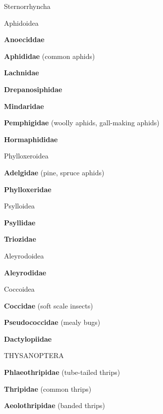 \documentclass[letterpaper,10pt]{article}
\begin{document}
{\makebox[0.20cm]{}  Sternorrhyncha \par
\makebox[0.40cm]{}  Aphidoidea \par
\makebox[0.6cm]{}  \textbf{Anoeciddae} \par
\makebox[0.6cm]{}  \textbf{Aphididae} (common aphids) \par
\makebox[0.6cm]{}  \textbf{Lachnidae} \par
\makebox[0.6cm]{}  \textbf{Drepanosiphidae} \par
\makebox[0.6cm]{}  \textbf{Mindaridae} \par
\makebox[0.6cm]{}  \textbf{Pemphigidae} (woolly aphids, gall-making aphids) \par
\makebox[0.6cm]{}  \textbf{Hormaphididae} \par
\makebox[0.40cm]{}  Phylloxeroidea \par
\makebox[0.6cm]{}  \textbf{Adelgidae} (pine, spruce aphids) \par
\makebox[0.6cm]{}  \textbf{Phylloxeridae} \par
\makebox[0.40cm]{}  Psylloidea \par
\makebox[0.6cm]{}  \textbf{Psyllidae} \par
\makebox[0.6cm]{}  \textbf{Triozidae} \par
\makebox[0.40cm]{}  Aleyrodoidea \par
\makebox[0.6cm]{}  \textbf{Aleyrodidae} \par
\makebox[0.40cm]{}  Coccoidea \par
\makebox[0.6cm]{}  \textbf{Coccidae} (soft scale insects) \par
\makebox[0.6cm]{}  \textbf{Pseudococcidae} (mealy bugs) \par
\makebox[0.6cm]{}  \textbf{Dactylopiidae} \par
%
%
%
\makebox[0.0cm]{}  THYSANOPTERA \par
\makebox[0.6cm]{}  \textbf{Phlaeothripidae} (tube-tailed thrips) \par
\makebox[0.6cm]{}  \textbf{Thripidae} (common thrips) \par
\makebox[0.6cm]{}  \textbf{Aeolothripidae} (banded thrips) \par
}
\end{document}
